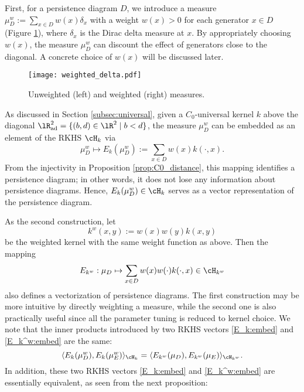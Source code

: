 \documentclass{article}
\newcommand{\dd}{{\delta}}
\begin{document}
First, for a persistence diagram $D$, we introduce a measure $\mu^{w}_{D}:=\sum_{x \in D} w(x)\dd_{x}$ with a weight $w(x) >0$ for each generator $x \in D$ (Figure \ref{fig:weighted}), where $\dd_x$ is the Dirac delta measure at $x$.
By appropriately choosing $w(x)$, the measure $\mu^{w}_{D}$ can discount the effect of generators close to the diagonal.
A concrete choice of $w(x)$ will be discussed later.
\begin{figure}[htbp]
\begin{center}
\texttt{[image: weighted\_delta.pdf]}
\caption{Unweighted (left) and weighted (right) measures.}
\vspace{-3mm}
\label{fig:weighted}
\end{center}
\end{figure}

As discussed in Section \ref{subsec:universal}, given a $C_0$-universal kernel $k$ above the diagonal $\lR^{2}_{{\rm ad}}=\{(b,d) \in \lR^{2} \mid b < d\}$, the measure $\mu^{w}_{D}$ can be embedded as an element of the RKHS $\cH_{k}$ via 
\begin{equation}\label{E_k:embed}
\mu^{w}_{D} \mapsto E_{k}(\mu^{w}_{D}):=\sum_{x\in D}w(x)k(\cdot,x).
\end{equation}
From the injectivity in Proposition \ref{prop:C0_distance}, this mapping identifies a persistence diagram; in other words, it does not lose any information about persistence diagrams.
Hence, $E_k(\mu^w_D)\in\cH_k$ serves as a vector representation of the persistence diagram.

As the second construction, let
\[
k^w(x,y):=w(x)w(y)k(x,y)
\]
be the weighted kernel with the same weight function as above.
Then the mapping 
\begin{equation}\label{E_k^w:embed}
E_{k^w}: \mu_D\mapsto \sum_{x\in D}w(x)w(\cdot)k(\cdot,x)\in \cH_{k^w}
\end{equation}
also defines a vectorization of persistence diagrams.
The first construction may be more intuitive by directly weighting a measure, while the second one is also practically useful since all the parameter tuning is reduced to kernel choice.
We note that the inner products introduced by two RKHS vectors \eqref{E_k:embed} and \eqref{E_k^w:embed} are the same:
\[
\langle E_k(\mu_D^w), E_k(\mu_E^w)\rangle_{\cH_k} = \langle E_{k^w}(\mu_D), E_{k^w}(\mu_E)\rangle_{\cH_{k^w}}.
\]
In addition, these two RKHS vectors \eqref{E_k:embed} and \eqref{E_k^w:embed} are essentially equivalent, as seen from the next proposition:
\end{document}
